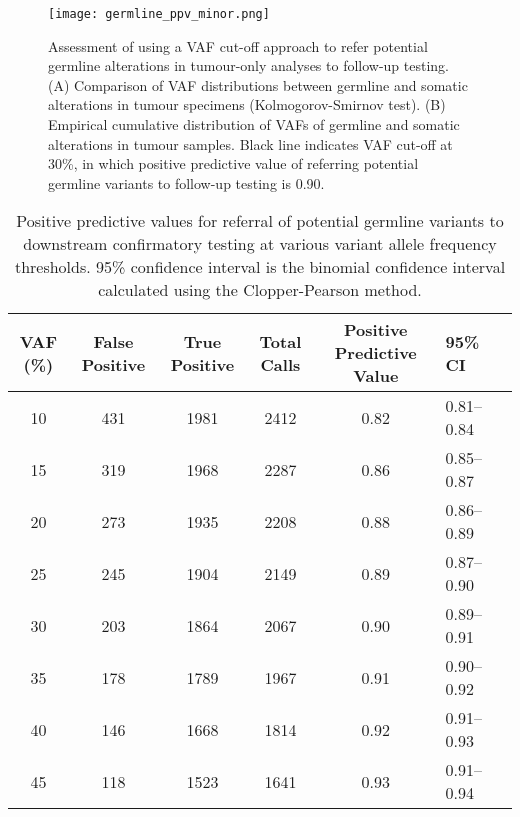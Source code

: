 \begin{figure}[H]
	\texttt{[image: germline\_ppv\_minor.png]}
	\caption{Assessment of using a VAF cut-off approach to refer potential germline alterations in tumour-only analyses to follow-up testing. (A) Comparison of VAF distributions between germline and somatic alterations in tumour specimens (Kolmogorov-Smirnov test). (B) Empirical cumulative distribution of VAFs of germline and somatic alterations in tumour samples. Black line indicates VAF cut-off at 30\%, in which positive predictive value of referring potential germline variants to follow-up testing is 0.90.}
	\label{fig:germline_ppv_minor}
\end{figure}


\begin{table}[H]
\caption{Positive predictive values for referral of potential germline variants to downstream confirmatory testing at various variant allele frequency thresholds. 95\% confidence interval is the binomial confidence interval calculated using the Clopper-Pearson method.}
\label{tbl:ppv}
\centering
      \begin{tabular}{cccccll}
        \hline
        VAF (\%) & False Positive & True Positive & Total Calls & Positive Predictive Value & 95\% CI
        \\
        \hline
        10 & 431 & 1981 & 2412 & 0.82 & 0.81--0.84
        \\
        15 & 319 & 1968 & 2287 & 0.86 & 0.85--0.87
        \\
        20 & 273 & 1935 & 2208 & 0.88 & 0.86--0.89
        \\
        25 & 245 & 1904 & 2149 & 0.89 & 0.87--0.90
        \\
        30 & 203 & 1864 & 2067 & 0.90 & 0.89--0.91
        \\
        35 & 178 & 1789 & 1967 & 0.91 & 0.90--0.92
        \\
        40 & 146 & 1668 & 1814 & 0.92 & 0.91--0.93
        \\
        45 & 118 & 1523 & 1641 & 0.93 & 0.91--0.94
        \\
				\hline
      \end{tabular} \\
\end{table}



